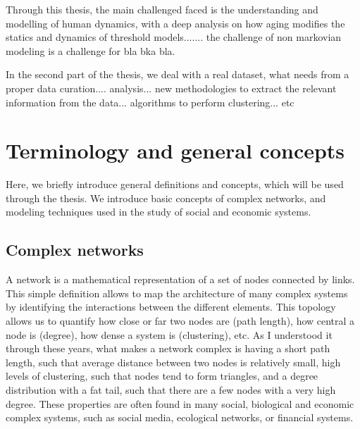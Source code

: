 Through this thesis, the main challenged faced is the understanding and modelling of human dynamics, with a deep analysis on how aging modifies the statics and dynamics of threshold models....... the challenge of non markovian modeling is a challenge for bla bka bla.

In the second part of the thesis, we deal with a real dataset, what needs from a proper data curation.... analysis... new methodologies to extract the relevant information from the data... algorithms to perform clustering... etc


\section{\label{sec:Terminology and general concepts} Terminology and general concepts}

Here, we briefly introduce general definitions and concepts, which will be used through the thesis. We introduce basic concepts of complex networks, and modeling techniques used in the study of social and economic systems.
\subsection{\label{subsec:Complex networks} Complex networks}
A network is a mathematical representation of a set of nodes connected by links. This simple definition allows to map the architecture of many complex systems by identifying the interactions between the different elements. This topology allows us to quantify how close or far two nodes are (path length), how central a node is (degree), how dense a system is (clustering), etc. As I understood it through these years, what makes a network complex is having a short path length, such that average distance between two nodes is relatively small, high levels of clustering, such that nodes tend to form triangles, and a degree distribution with a fat tail, such that there are a few nodes with a very high degree. These properties are often found in many social, biological and economic complex systems, such as social media, ecological networks, or financial systems.

